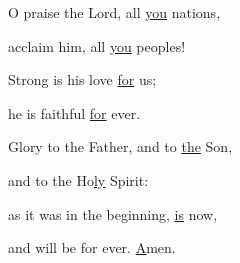 \noindent O praise the Lord, all \uline{you} nations,~\GreStar{}~\nopagebreak

acclaim him, all \uline{you} peoples!

\noindent Strong is his love \uline{for} us;~\GreStar{}~\nopagebreak

he is faithful \uline{for} ever.

\noindent Glory to the Father, and to \uline{the} Son,~\GreStar{}~\nopagebreak

and to the Ho\uline{ly} Spirit:

\noindent as it was in the beginning, \uline{is} now,~\GreStar{}~\nopagebreak

and will be for ever. \uline{A}men.
